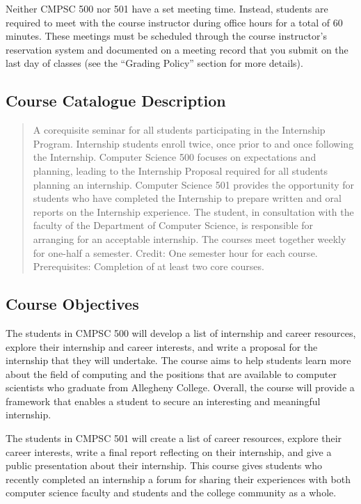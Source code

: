 Neither CMPSC 500 nor 501 have a set meeting time.  Instead, students are required to meet with the course instructor
during office hours for a total of 60 minutes.  These meetings must be scheduled through the course instructor's reservation
system and documented on a meeting record that you submit on the last day of classes (see the ``Grading Policy''
section for more details).

\subsection*{Course Catalogue Description}

\begin{quote}
A corequisite seminar for all students participating in the Internship Program.  Internship students enroll twice, once
prior to and once following the Internship. Computer Science 500 focuses on expectations and planning, leading to the
Internship Proposal required for all students planning an internship.  Computer Science 501 provides the opportunity for
students who have completed the Internship to prepare written and oral reports on the Internship experience. The
student, in consultation with the faculty of the Department of Computer Science, is responsible for arranging for an
acceptable internship.  The courses meet together weekly for one-half a semester. Credit: One semester hour for each
course. Prerequisites: Completion of at least two core courses.
\end{quote}

\subsection*{Course Objectives}

The students in CMPSC 500 will develop a list of internship and career resources, explore their internship and career
interests, and write a proposal for the internship that they will undertake. The course aims to help students
learn more about the field of computing and the positions that are available to computer scientists who graduate from
Allegheny College.  Overall, the course will provide a framework that enables a student to secure an interesting and
meaningful internship.

\noindent
The students in CMPSC 501 will create a list of career resources, explore their career interests, write a final report
reflecting on their internship, and give a public presentation about their internship.  This course gives
students who recently completed an internship a forum for sharing their experiences with both computer science faculty
and students and the college community as a whole.

